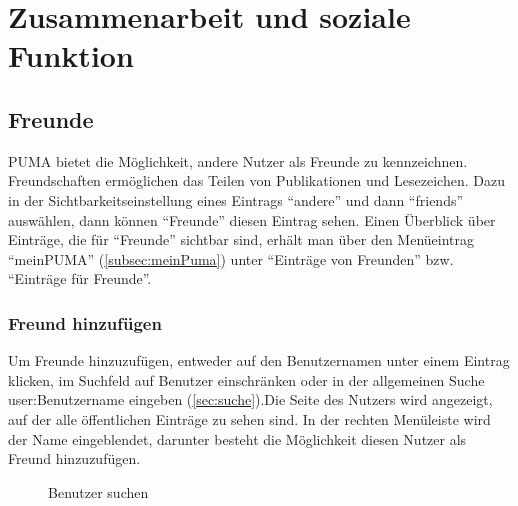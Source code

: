 \chapter{Zusammenarbeit und soziale Funktion}
\label{ch:zusammenarbeit}

\section{Freunde}%
\label{sec:freunde}
PUMA bietet die Möglichkeit, andere Nutzer als Freunde zu kennzeichnen. Freundschaften ermöglichen das Teilen von Publikationen und Lesezeichen. Dazu in der Sichtbarkeitseinstellung eines Eintrags \enquote{andere} und dann \enquote{friends} auswählen, dann können \enquote{Freunde} diesen Eintrag sehen. Einen Überblick über Einträge, die für \enquote{Freunde} sichtbar sind, erhält man über den Menüeintrag \enquote{meinPUMA} (\autoref{subsec:meinPuma}) unter \enquote{Einträge von Freunden} bzw. \enquote{Einträge für Freunde}.\newline

\subsection{Freund hinzufügen}
\label{subsec:freundHinzu}

Um Freunde hinzuzufügen, entweder auf den Benutzernamen unter einem Eintrag klicken, im Suchfeld auf Benutzer einschränken oder in der allgemeinen Suche user:Benutzername eingeben (\autoref{sec:suche}).Die Seite des Nutzers wird angezeigt, auf der alle öffentlichen Einträge zu sehen sind. In der rechten Menüleiste wird der Name eingeblendet, darunter besteht die Möglichkeit diesen Nutzer als Freund hinzuzufügen.
    
		

		\begin{figure}[h!]
 \centering
 \caption{Benutzer suchen}
 \label{fig:benutzerSuchen}
\end{figure}

